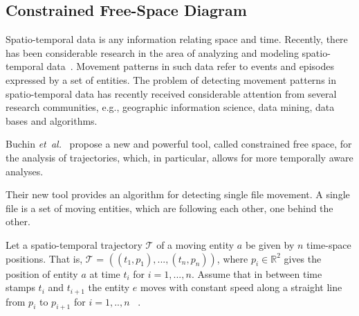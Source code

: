 \documentclass[12pt]{dalthesis}
\newcommand{\IR}{\ensuremath{\mathbb{R}}}
\newcommand{\etal}{{\em et~al.\/}}
\newcommand{\CT}{{\mathscr T}}
\begin{document}
\subsection{Constrained Free-Space Diagram}


Spatio-temporal data is any information relating space and time. 
Recently, there has been considerable research 
in the area of analyzing and modeling spatio-temporal data~\cite{Cons-Free}. 
Movement patterns in such data refer to 
events and episodes expressed by a set of entities.
The problem of detecting movement patterns in spatio-temporal data has recently received considerable 
attention from several research communities, e.g., geographic information science, data mining, data bases and algorithms.

Buchin \etal~\cite{Cons-Free} propose a new and powerful tool, called constrained free space, 
for the analysis of trajectories, which, in  particular, allows for more temporally aware analyses. 

Their new tool provides an algorithm for detecting single file movement. 
A single file is a set of moving entities, which 
are following each other, one behind the other. 

Let a spatio-temporal trajectory $\CT$ of a moving entity $a$ be
given by $n$ time-space positions. That is, $\CT$ = $((t_1, p_1),...,(t_n, p_n))$, 
where $p_i \in \IR^2$ gives the position of entity $a$ 
at time $t_i$ for $i = 1,..., n$.
Assume that in between time stamps $t_i$ and $t_{i+1}$ the
entity $e$ moves with constant speed along a straight line
from $p_i$ to $p_{i+1}$ for $i = 1,..,n$ ~\cite{Cons-Free}. 
\end{document}
